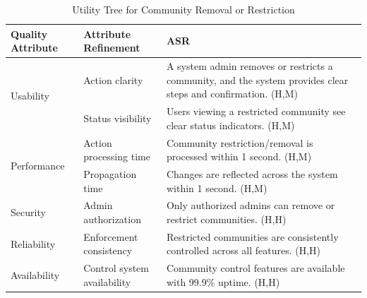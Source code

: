 \documentclass{article}
\begin{document}
\begin{table}[H]
    \centering
    \caption{Utility Tree for Community Removal or Restriction}
    \begin{tabular}{|p{3cm}|p{4cm}|p{7cm}|}
        \hline
        \textbf{Quality Attribute} & \textbf{Attribute Refinement}                                                                                & \textbf{ASR} \\
        \hline

        \multirow{2}{*}{Usability}
                                   & Action clarity
                                   & A system admin removes or restricts a community, and the system provides clear steps and confirmation. (H,M)                \\
        \cline{2-3}
                                   & Status visibility
                                   & Users viewing a restricted community see clear status indicators. (H,M)                                                     \\
        \hline

        \multirow{2}{*}{Performance}
                                   & Action processing time
                                   & Community restriction/removal is processed within 1 second. (H,M)                                                           \\
        \cline{2-3}
                                   & Propagation time
                                   & Changes are reflected across the system within 1 second. (H,M)                                                              \\
        \hline

        Security
                                   & Admin authorization
                                   & Only authorized admins can remove or restrict communities. (H,H)                                                            \\
        \hline

        Reliability
                                   & Enforcement consistency
                                   & Restricted communities are consistently controlled across all features. (H,H)                                               \\
        \hline

        Availability
                                   & Control system availability
                                   & Community control features are available with 99.9\% uptime. (H,H)                                                          \\
        \hline


\end{tabular}
\end{table}
\end{document}

